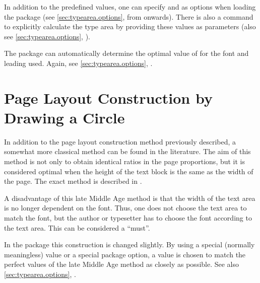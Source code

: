 \begin{Explain}
  In addition to the predefined values, one can specify  and
   as options when loading the package (see
  \autoref{sec:typearea.options}, from
   onwards). There is also a
  command to explicitly calculate the type area by providing these
  values as parameters (also see \autoref{sec:typearea.options},
  ).

  The  package can automatically determine the
  optimal value of  for the font and leading used.
  Again, see \autoref{sec:typearea.options},
  .
\end{Explain}


\section{Page Layout Construction by Drawing a Circle}

\begin{Explain}
  In addition to the page layout construction
  method previously described, a somewhat more classical method can be
  found in the literature. The aim of this method is not only to
  obtain identical ratios in the page proportions, but it is
  considered optimal when the height of the text block is the same as
  the width of the page. The exact method is described in
  \cite{JTsch87}.

  A disadvantage of this late Middle Age method is that the width of
  the text area is no longer dependent on the font. Thus, one does not
  choose the text area to match the font, but the author or typesetter
  has to choose the font according to the text area. This can be
  considered a ``must''.

  In the  package this construction is changed
  slightly. By using a special (normally meaningless)  value
  or a special package option, a  value is chosen to match
  the perfect values of the late Middle Age method as closely as
  possible. See also \autoref{sec:typearea.options},
  .
\end{Explain}


